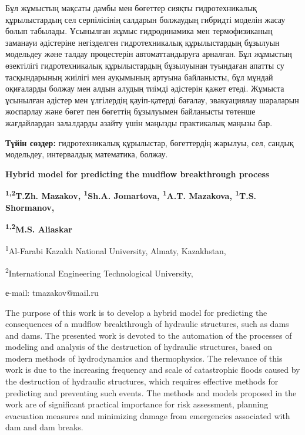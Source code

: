 Бұл жұмыстың мақсаты дамбы мен бөгеттер сияқты гидротехникалық
құрылыстардың сел серпілісінің салдарын болжаудың гибридті моделін жасау
болып табылады. Ұсынылған жұмыс гидродинамика мен термофизиканың
заманауи әдістеріне негізделген гидротехникалық құрылыстардың бұзылуын
модельдеу және талдау процестерін автоматтандыруға арналған. Бұл
жұмыстың өзектілігі гидротехникалық құрылыстардың бұзылуынан туындаған
апатты су тасқындарының жиілігі мен ауқымының артуына байланысты, бұл
мұндай оқиғаларды болжау мен алдын алудың тиімді әдістерін қажет етеді.
Жұмыста ұсынылған әдістер мен үлгілердің қауіп-қатерді бағалау,
эвакуациялау шараларын жоспарлау және бөгет пен бөгеттің бұзылуымен
байланысты төтенше жағдайлардан залалдарды азайту үшін маңызды
практикалық маңызы бар.

{\bfseries Түйін сөздер:} гидротехникалық құрылыстар, бөгеттердің жарылуы,
сел, сандық модельдеу, интервалдық математика, болжау.

\begin{center}
{\large\bfseries Hybrid model for predicting the mudflow breakthrough process}

{\bfseries \textsuperscript{1,2}T.Zh. Mazakov, \textsuperscript{1}Sh.A.
Jomartova, \textsuperscript{1}A.T. Mazakova, \textsuperscript{1}T.S.
Shormanov,}

{\bfseries \textsuperscript{1,2}M.S. Aliaskar}

\textsuperscript{1}Al-Farabi Kazakh National University, Almaty,
Kazakhstan,

\textsuperscript{2}International Engineering Technological University,

е-mail: tmazakov@mail.ru
\end{center}

The purpose of this work is to develop a hybrid model for predicting the
consequences of a mudflow breakthrough of hydraulic structures, such as
dams and dams. The presented work is devoted to the automation of the
processes of modeling and analysis of the destruction of hydraulic
structures, based on modern methods of hydrodynamics and thermophysics.
The relevance of this work is due to the increasing frequency and scale
of catastrophic floods caused by the destruction of hydraulic
structures, which requires effective methods for predicting and
preventing such events. The methods and models proposed in the work are
of significant practical importance for risk assessment, planning
evacuation measures and minimizing damage from emergencies associated
with dam and dam breaks.

